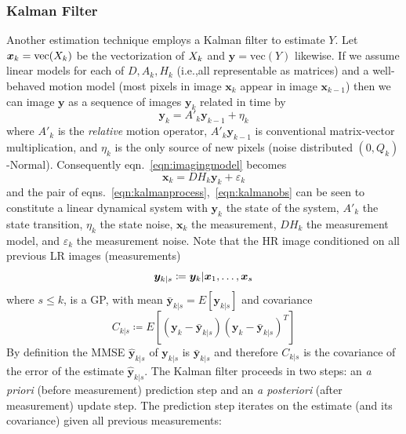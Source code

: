 \subsubsection{Kalman Filter}
Another estimation technique employs a Kalman filter\cite{elad1999} to estimate \(Y\).
%
Let \(\bm{x}_k = \text{vec}(X_k)\) be the vectorization of \(X_k\) and \(\bm{y} = \text{vec}(Y)\) likewise.
%
If we assume linear models for each of \(D, A_k, H_k\) (i.e.,all representable as matrices) and a well-behaved motion model (most pixels in image \(\bm{x}_k\) appear in image \(\bm{x}_{k-1}\)) then we can image \(\bm{y}\) as a sequence of images \(\bm{y}_k\) related in time by
\begin{equation}
	\bm{y}_k = A'_k \bm{y}_{k-1} + \eta_k
	\label{eqn:kalmanprocess}
\end{equation}
%
where \(A'_k\) is the \textit{relative} motion operator, \(A'_k\bm{y}_{k-1}\) is conventional matrix-vector multiplication, and \(\eta_k\) is the only source of new pixels (noise distributed \((0, Q_k)\)-Normal).
%
Consequently eqn.~\eqref{eqn:imagingmodel} becomes
\begin{equation}
	\bm{x}_k = DH_k\bm{y}_k + \varepsilon_k
	\label{eqn:kalmanobs}
\end{equation}
and the pair of eqns.~\ref{eqn:kalmanprocess},~\ref{eqn:kalmanobs} can be seen to constitute a linear dynamical system with \(\bm{y}_k\) the state of the system, \(A'_k\) the state transition, \(\eta_k\) the state noise, \(\bm{x}_k\) the measurement, \(DH_k\) the measurement model, and \(\varepsilon_k\) the measurement noise.
%
Note that the HR image conditioned on all previous LR images (measurements)
\begin{equation}
	\bm{y}_{k|s} \coloneqq \bm{y}_k|\bm{x}_1, \mathellipsis, \bm{x}_s
\end{equation}
where \(s \leq k\), is a GP, with mean \(\bar{\bm{y}}_{k|s} = E\left[\bm{y}_{k|s}\right]\)
and covariance
\begin{equation}
	C_{k|s} \coloneqq E\left[ (\bm{y}_k - \bar{\bm{y}}_{k|s})(\bm{y}_k - \bar{\bm{y}}_{k|s})^T  \right]
\end{equation}
%
By definition the MMSE \(\hat{\bm{y}}_{k|s}\) of \(\bm{y}_{k|s}\) is \(\bar{\bm{y}}_{k|s}\) and therefore \(C_{k|s}\) is the covariance of the error of the estimate \(\hat{\bm{y}}_{k|s}\).
%
The Kalman filter proceeds in two steps: an \textit{a priori} (before measurement) prediction step and an \textit{a posteriori} (after measurement) update step.
%
The prediction step iterates on the estimate (and its covariance) given all previous measurements:
